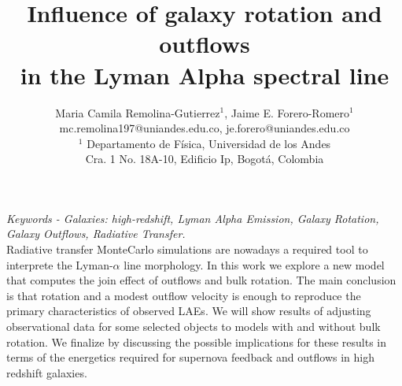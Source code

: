 \documentclass[11pt,a4paper]{article}
\begin{document}
\thispagestyle{empty}

\title{\textbf{Influence of galaxy rotation and outflows \\
			   in the Lyman Alpha spectral line}}
		
\author{Maria Camila Remolina-Gutierrez$^1$, Jaime E. Forero-Romero$^1$\\ \vspace{3mm}
	    mc.remolina197@uniandes.edu.co, \hspace{0.8mm} je.forero@uniandes.edu.co\\ 
		$^1$ Departamento de F\'{i}sica, Universidad de los Andes \\
		Cra. 1 No. 18A-10, Edificio Ip, Bogot\'a, Colombia}
\date{} %
\maketitle\thispagestyle{empty} %
\textit{Keywords - Galaxies: high-redshift, Lyman Alpha Emission, Galaxy Rotation, Galaxy Outflows, Radiative Transfer.}\\

Radiative transfer MonteCarlo simulations are nowadays a required tool
to interprete the Lyman-$\alpha$ line morphology. In this work we
explore a new model that computes the join effect of outflows and
bulk rotation. The main conclusion is that rotation and a modest
outflow velocity is enough to reproduce the primary characteristics of
observed LAEs. 
We will show results of adjusting observational data for some selected
objects to models with and without bulk rotation. We finalize by
discussing the possible implications for these results in terms of the
energetics required for supernova feedback and outflows in high
redshift galaxies. 





\end{document}

